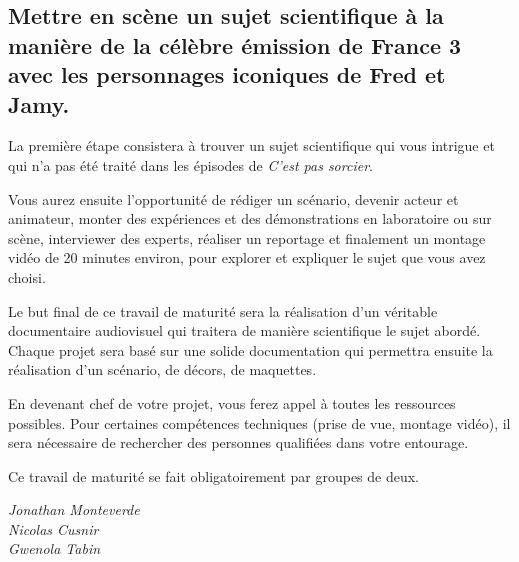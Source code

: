 \documentclass[
  10pt,
  french,
  a5paper,
  openany]{book}
\newenvironment{signature}{\begin{flushright}}{\end{flushright}}
\begin{document}
\hypertarget{mettre-en-scuxe8ne-un-sujet-scientifique-uxe0-la-maniuxe8re-de-la-cuxe9luxe8bre-uxe9mission-de-france-3-avec-les-personnages-iconiques-de-fred-et-jamy.}{%
\subsection*{Mettre en scène un sujet scientifique à la manière de la célèbre émission de France 3 avec les personnages iconiques de Fred et Jamy.}\label{mettre-en-scuxe8ne-un-sujet-scientifique-uxe0-la-maniuxe8re-de-la-cuxe9luxe8bre-uxe9mission-de-france-3-avec-les-personnages-iconiques-de-fred-et-jamy.}}


La première étape consistera à trouver un sujet scientifique qui vous intrigue et qui n'a pas été traité dans les épisodes de \emph{C'est pas sorcier}.

Vous aurez ensuite l'opportunité de rédiger un scénario, devenir acteur et animateur, monter des expériences et des démonstrations en laboratoire ou sur scène, interviewer des experts, réaliser un reportage et finalement un montage vidéo de 20 minutes environ, pour explorer et expliquer le sujet que vous avez choisi.

Le but final de ce travail de maturité sera la réalisation d'un véritable documentaire audiovisuel qui traitera de manière scientifique le sujet abordé. Chaque projet sera basé sur une solide documentation qui permettra ensuite la réalisation d'un scénario, de décors, de maquettes.

\clearpage

En devenant chef de votre projet, vous ferez appel à toutes les ressources possibles. Pour certaines compétences techniques (prise de vue, montage vidéo), il sera nécessaire de rechercher des personnes qualifiées dans votre entourage.

Ce travail de maturité se fait obligatoirement par groupes de deux.

\begin{signature}
\emph{Jonathan Monteverde}\\
\emph{Nicolas Cusnir}\\
\emph{Gwenola Tabin}

\end{signature}
\end{document}
